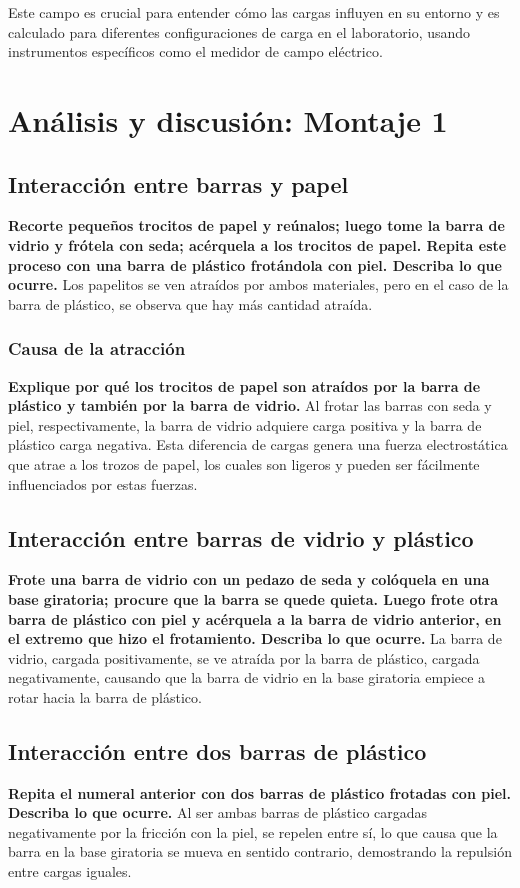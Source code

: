 Este campo es crucial para entender cómo las cargas influyen en su entorno y es calculado para diferentes configuraciones de carga en el laboratorio, usando instrumentos específicos como el medidor de campo eléctrico.

\section{Análisis y discusión: Montaje 1}

\subsection{Interacción entre barras y papel}
\textbf{Recorte pequeños trocitos de papel y reúnalos; luego tome la barra de vidrio y frótela con
seda; acérquela a los trocitos de papel. Repita este proceso con una barra de plástico
frotándola con piel. Describa lo que ocurre.} Los papelitos se ven atraídos por ambos materiales, pero en el caso de la barra de plástico, se observa que hay más cantidad atraída.

\subsubsection{Causa de la atracción}
\textbf{Explique por qué los trocitos de papel son atraídos por la barra de plástico y también por la barra de vidrio.} Al frotar las barras con seda y piel, respectivamente, la barra de vidrio adquiere carga positiva y la barra de plástico carga negativa. Esta diferencia de cargas genera una fuerza electrostática que atrae a los trozos de papel, los cuales son ligeros y pueden ser fácilmente influenciados por estas fuerzas.

\subsection{Interacción entre barras de vidrio y plástico}
\textbf{Frote una barra de vidrio con un pedazo de seda y colóquela en una base giratoria; procure
que la barra se quede quieta. Luego frote otra barra de plástico con piel y acérquela a la
barra de vidrio anterior, en el extremo que hizo el frotamiento. Describa lo que ocurre.} La barra de vidrio, cargada positivamente, se ve atraída por la barra de plástico, cargada negativamente, causando que la barra de vidrio en la base giratoria empiece a rotar hacia la barra de plástico.

\subsection{Interacción entre dos barras de plástico}
\textbf{Repita el numeral anterior con dos barras de plástico frotadas con piel. Describa lo que
ocurre.} Al ser ambas barras de plástico cargadas negativamente por la fricción con la piel, se repelen entre sí, lo que causa que la barra en la base giratoria se mueva en sentido contrario, demostrando la repulsión entre cargas iguales.

